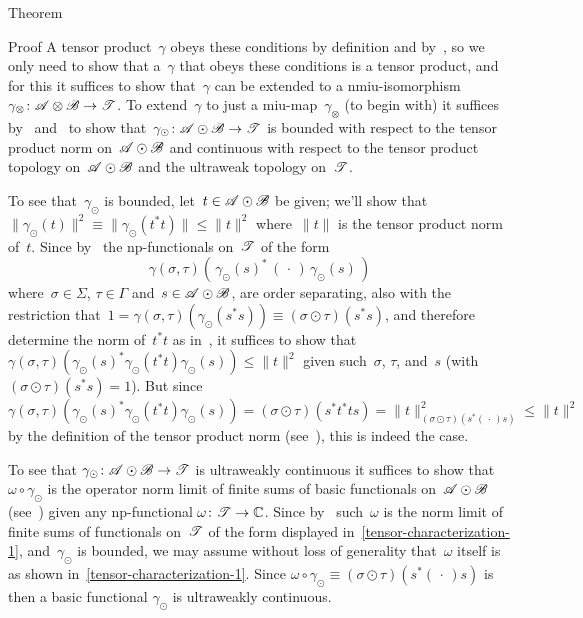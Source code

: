 \documentclass[a]{subfiles}
\begin{document}
\begin{parsec}
\begin{point}{Theorem}
\begin{point}{Proof}
A tensor product~$\gamma$
obeys these conditions
by definition and by~,
so we only need to show that
a~$\gamma$ that obeys these conditions is a tensor product,
and for this it
suffices to show that~$\gamma$ can be extended
to a nmiu-isomorphism $\gamma_\otimes \colon \mathscr{A}\otimes\mathscr{B}\to \mathscr{T}$.
To extend~$\gamma$ to just a miu-map~$\gamma_\otimes$
(to begin with)
it suffices by~
and~ 
to show that~$\gamma_\odot\colon \mathscr{A}\odot\mathscr{B}\to\mathscr{T}$
is bounded with respect to the tensor product norm
on~$\mathscr{A}\odot\mathscr{B}$
and continuous with respect to the tensor product
topology on~$\mathscr{A}\odot \mathscr{B}$ and the ultraweak topology on~$\mathscr{T}$.

To see that~$\gamma_\odot$
is bounded, 
let~$t\in \mathscr{A}\odot\mathscr{B}$ be given;
we'll show
that~$\|\gamma_\odot(t)\|^2
\equiv \|\gamma_\odot(t^*t)\|\leq \|t\|^2$
where~$\|t\|$ is the tensor product norm of~$t$.
Since by~
the np-functionals on~$\mathscr{T}$
of the form
\begin{equation}
	\label{tensor-characterization-1}	
	\gamma(\sigma,\tau)(\,\gamma_\odot(s)^*\,
(\,\cdot\,)\,\gamma_\odot(s)\,)
\end{equation}
where~$\sigma\in\Sigma$, $\tau\in\Gamma$
and~$s\in\mathscr{A}\odot\mathscr{B}$,
are order separating,
also with  the restriction
that~$1=\gamma(\sigma,\tau)(\gamma_\odot(s^*s))\equiv
(\sigma\odot\tau)(s^*s)$,
and therefore determine the norm of~$t^*t$ as in~,
it suffices to show that
$\gamma(\sigma,\tau)(\gamma_\odot(s)^* \gamma_\odot(t^*t)
\gamma_\odot(s)) \leq \|t\|^2$
given such~$\sigma$, $\tau$, and~$s$
(with $(\sigma\odot \tau)(s^*s)=1$).
But since $
\gamma(\sigma,\tau)(\gamma_\odot(s)^* \gamma_\odot(t^*t)\gamma_\odot(s)) =
(\sigma\odot\tau)(s^* t^*t s)
= \|t\|_{(\sigma\odot\tau)(s^*(\,\cdot\,)s)}^2
\leq \|t\|^2$
by the definition of the tensor product norm
(see~),
this is indeed the case.

To see that $\gamma_\odot\colon \mathscr{A}\odot\mathscr{B}\to\mathscr{T}$
is ultraweakly continuous
it suffices to show that  $\omega\circ \gamma_\odot$
is the operator norm limit of finite sums of basic functionals
on~$\mathscr{A}\odot\mathscr{B}$
(see~)
given any np-functional $\omega\colon \mathscr{T}\to\mathbb{C}$.
Since by~ such~$\omega$
is the norm limit
of finite sums of
functionals on~$\mathscr{T}$
of the form displayed in~\eqref{tensor-characterization-1},
and~$\gamma_\odot$
is bounded,
we may assume without loss of generality
that~$\omega$
itself is as shown in~\eqref{tensor-characterization-1}.
Since $\omega\circ \gamma_\odot 
\equiv (\sigma\odot\tau)(s^*(\,\cdot\,)s)$
is then a basic functional $\gamma_\odot$
is ultraweakly continuous.


\end{point}
\end{point}
\end{parsec}
\end{document}
